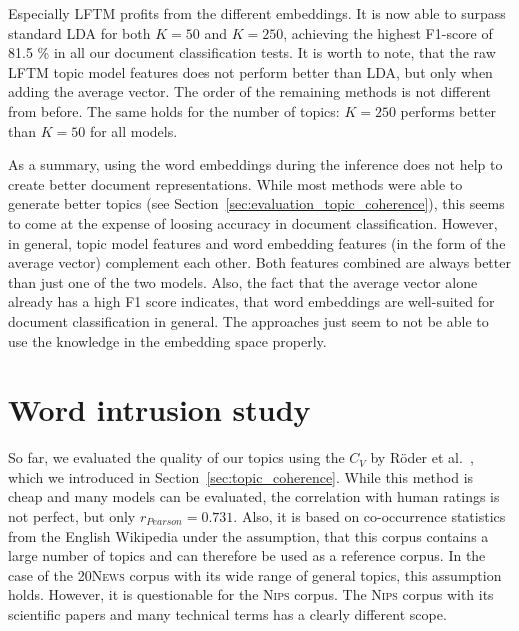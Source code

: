 \documentclass[
        a4paper,
        titlepage,
        twoside,
        parskip,
        numbers=noenddot
        ]{scrbook}
\theoremstyle{break}
\begin{document}
Especially LFTM profits from the different embeddings.
It is now able to surpass standard LDA for both $K = 50$ and $K = 250$, achieving the highest F1-score of 81.5 \% in all our document classification tests.
It is worth to note, that the raw LFTM topic model features does not perform better than LDA, but only when adding the average vector.
The order of the remaining methods is not different from before.
The same holds for the number of topics: $K = 250$ performs better than $K = 50$ for all models.

As a summary, using the word embeddings during the inference does not help to create better document representations.
While most methods were able to generate better topics (see Section~\ref{sec:evaluation_topic_coherence}), this seems to come at the expense of loosing accuracy in document classification.
However, in general, topic model features and word embedding features (in the form of the average vector) complement each other.
Both features combined are always better than just one of the two models.
Also, the fact that the average vector alone already has a high F1 score indicates, that word embeddings are well-suited for document classification in general.
The approaches just seem to not be able to use the knowledge in the embedding space properly.

\section{Word intrusion study}

So far, we evaluated the quality of our topics using the $C_V$ by Röder et al.~\cite{Roder2015}, which we introduced in Section~\ref{sec:topic_coherence}.
While this method is cheap and many models can be evaluated, the correlation with human ratings is not perfect, but only $r_{Pearson} = 0.731$.
Also, it is based on co-occurrence statistics from the English Wikipedia under the assumption, that this corpus contains a large number of topics and can therefore be used as a reference corpus.
In the case of the \textsc{20News} corpus with its wide range of general topics, this assumption holds.
However, it is questionable for the \textsc{Nips} corpus.
The \textsc{Nips} corpus with its scientific papers and many technical terms has a clearly different scope.
\end{document}
